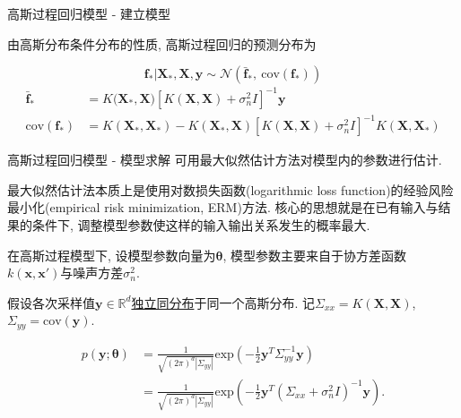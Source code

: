 \documentclass[10pt,mathserif]{beamer}
\theoremstyle{definition}
\numberwithin{equation}{section} %
\begin{document}
    \begin{frame}[fragile]{高斯过程回归模型 - 建立模型}

        由高斯分布条件分布的性质, 高斯过程回归的预测分布为

        $$\boldsymbol{f}_{*}|\boldsymbol{X}_{*},\boldsymbol{X},\boldsymbol{y}\sim\mathcal{N}(\boldsymbol{\bar{f}}_{*},\ \mathrm{cov}(\boldsymbol{f}_{*}))$$
        $$\boxed{\begin{aligned}
            \boldsymbol{\bar{f}}_{*}&=K\bigl(\boldsymbol{X}_{*},\boldsymbol{X})[K(\boldsymbol{X},\boldsymbol{X})+\sigma^{2}_{n}I]^{-1}\boldsymbol{y} \\
            \mathrm{cov}(\boldsymbol{f}_{*})&=K(\boldsymbol{X}_{*},\boldsymbol{X}_{*})-K(\boldsymbol{X}_{*},\boldsymbol{X})[K(\boldsymbol{X},\boldsymbol{X})+\sigma^{2}_{n}I]^{-1}K(\boldsymbol{X},\boldsymbol{X}_{*})
        \end{aligned}}$$

    \end{frame}

    \begin{frame}[fragile]{高斯过程回归模型 - 模型求解}
        可用最大似然估计方法对模型内的参数进行估计. 
        
        最大似然估计法本质上是使用对数损失函数(logarithmic loss function)的经验风险最小化(empirical risk minimization, ERM)方法. 核心的思想就是在已有输入与结果的条件下, 调整模型参数使这样的输入输出关系发生的概率最大.

        在高斯过程模型下, 设模型参数向量为$\boldsymbol{\theta}$, 模型参数主要来自于协方差函数$k(\boldsymbol{x},\boldsymbol{x}')$与噪声方差$\sigma^{2}_{n}$.
        
        假设各次采样值$\boldsymbol{y}\in\mathds{R}^{d}$\uline{独立同分布}于同一个高斯分布. 记$\Sigma_{xx}=K(\boldsymbol{X},\boldsymbol{X})$, $\Sigma_{yy}=\mathrm{cov}(\boldsymbol{y})$.

        \begin{equation}
            \begin{aligned}
                p(\boldsymbol{y};\boldsymbol{\theta}) &= \frac{1}{\sqrt{(2\pi)^{d}|\Sigma_{yy}|}}\mathrm{exp}\left(-\frac{1}{2}\boldsymbol{y}^{T}\Sigma_{yy}^{-1}\boldsymbol{y} \right) \\
                &= \frac{1}{\sqrt{(2\pi)^{d}|\Sigma_{yy}|}}\mathrm{exp}\left(-\frac{1}{2}\boldsymbol{y}^{T}( \Sigma_{xx} + \sigma^{2}_{n}I)^{-1}\boldsymbol{y} \right).
            \end{aligned}
        \end{equation}
    \end{frame}
\end{document}
